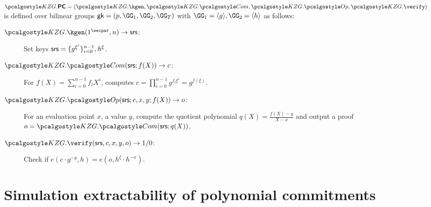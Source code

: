 \documentclass[runningheads,11pt]{llncs}
\begin{document}
$\Kzg.\PC = (\Kzg.\kgen, \Kzg.\com, \Kzg.\open, \Kzg.\verify)$ is defined over bilinear groups $\gk=(p,\GG_1,\allowbreak \GG_2, \allowbreak \GG_T )$ with $\GG_1 =\langle g\rangle, \GG_2 =\langle h \rangle$ as follows:
\begin{description}%
\item[$\Kzg.\kgen(1^\secpar, n) \to \srs$:] Set keys
$\mathsf{srs} = \{g^{\xi^i}\}_{i=0}^{n-1}, h^\xi$.
\item[$\Kzg.\CM(\srs; f(X)) \to c$:] For
  $f(X) = \sum_{i=0}^{n-1} f_i X^i$, computes
  $c=\prod _{i=0}^{n-1} g^{f_i \xi^i} = g^{f(\xi)} $.
\item[$\Kzg.\open(\srs; c, x, y; f(X)) \to o$:] For an evaluation point
  $x$, a value $y$, compute the quotient polynomial
  $q(X) = \displaystyle\frac{f(X) -y }{X-x}$ and output a proof
  $o = \Kzg.\CM(\srs; q(X)) $.
\item[$\Kzg.\verify(\srs, c, x, y, o) \to 1/0$:] Check if
  $e(c \cdot g^{-y}, h)=e(o , h^{\xi}\cdot h^{-x})$.
\end{description}


\section{Simulation extractability of polynomial commitments}
\end{document}
